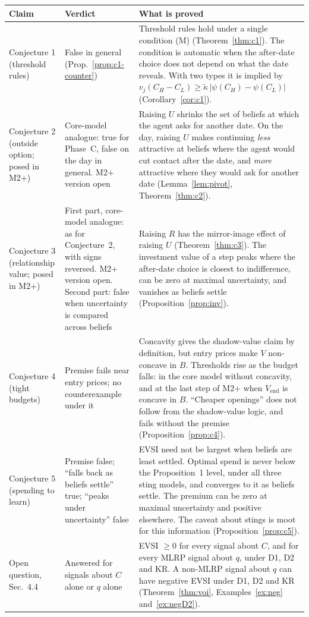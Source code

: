 \documentclass[11pt,a4paper]{article}
\theoremstyle{definition}
\theoremstyle{remark}
\newcommand{\Vend}{V_{\mathrm{end}}}
\newcommand{\kt}{\tilde\kappa}
\begin{document}
\begin{center}
\small
\begin{tabular}{@{}>{\raggedright\arraybackslash}p{2.6cm}>{\raggedright\arraybackslash}p{3.3cm}>{\raggedright\arraybackslash}p{8.8cm}@{}}
\toprule
Claim & Verdict & What is proved \\
\midrule
Conjecture 1 (threshold rules) & False in general (Prop.~\ref{prop:c1-counter}) & Threshold rules hold under a single condition (M) (Theorem~\ref{thm:c1}). The condition is automatic when the after-date choice does not depend on what the date reveals. With two types it is implied by $v_j(C_H-C_L)\ge\kt\,|\psi(C_H)-\psi(C_L)|$ (Corollary~\ref{cor:c1}). \\[2pt]
Conjecture 2 (outside option; posed in M2+) & Core-model analogue: true for Phase~C, false on the day in general. M2+ version open & Raising $U$ shrinks the set of beliefs at which the agent asks for another date. On the day, raising $U$ makes continuing \emph{less} attractive at beliefs where the agent would cut contact after the date, and \emph{more} attractive where they would ask for another date (Lemma~\ref{lem:pivot}, Theorem~\ref{thm:c2}). \\[2pt]
Conjecture 3 (relationship value; posed in M2+) & First part, core-model analogue: as for Conjecture~2, with signs reversed. M2+ version open. Second part: false when uncertainty is compared across beliefs & Raising $R$ has the mirror-image effect of raising $U$ (Theorem~\ref{thm:c3}). The investment value of a step peaks where the after-date choice is closest to indifference, can be zero at maximal uncertainty, and vanishes as beliefs settle (Proposition~\ref{prop:inv}). \\[2pt]
Conjecture 4 (tight budgets) & Premise fails near entry prices; no counterexample under it & Concavity gives the shadow-value claim by definition, but entry prices make $V$ non-concave in $B$. Thresholds rise as the budget falls: in the core model without concavity, and at the last step of M2+ when $\Vend$ is concave in $B$. ``Cheaper openings'' does not follow from the shadow-value logic, and fails without the premise (Proposition~\ref{prop:c4}). \\[2pt]
Conjecture 5 (spending to learn) & Premise false; ``falls back as beliefs settle'' true; ``peaks under uncertainty'' false & EVSI need not be largest when beliefs are least settled. Optimal spend is never below the Proposition~1 level, under all three sting models, and converges to it as beliefs settle. The premium can be zero at maximal uncertainty and positive elsewhere. The caveat about stings is moot for this information (Proposition~\ref{prop:c5}). \\[2pt]
Open question, Sec.~4.4 & Answered for signals about $C$ alone or $q$ alone & EVSI $\ge0$ for every signal about $C$, and for every MLRP signal about $q$, under D1, D2 and KR. A non-MLRP signal about $q$ can have negative EVSI under D1, D2 and KR (Theorem~\ref{thm:voi}, Examples~\ref{ex:neg} and~\ref{ex:negD2}). \\
\bottomrule
\end{tabular}
\end{center}
\end{document}
